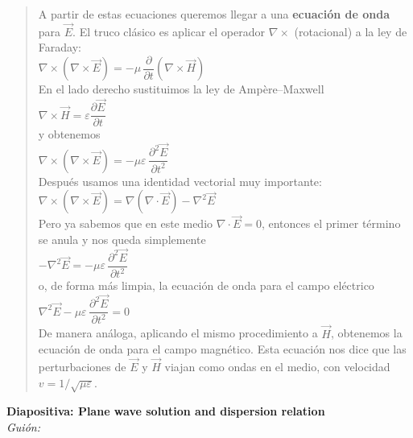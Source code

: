 \documentclass{article}
\begin{document}
\begin{quote}
A partir de estas ecuaciones queremos llegar a una \textbf{ecuación de onda} para \(\vec{E}\). 
El truco clásico es aplicar el operador \(\nabla\times\) (rotacional) a la ley de Faraday:\\[2mm]
\(\nabla\times(\nabla\times\vec{E}) = -\mu\,\dfrac{\partial}{\partial t}(\nabla\times\vec{H})\)\\[2mm]
En el lado derecho sustituimos la ley de Ampère--Maxwell\\[1mm]
\(\nabla\times\vec{H} = \varepsilon\dfrac{\partial \vec{E}}{\partial t}\)\\[2mm]
y obtenemos\\[1mm]
\(\nabla\times(\nabla\times\vec{E}) = -\mu\varepsilon\,\dfrac{\partial^2 \vec{E}}{\partial t^2}\)\\[2mm]
Después usamos una identidad vectorial muy importante:\\[1mm]
\(\nabla\times(\nabla\times\vec{E}) = \nabla(\nabla\cdot\vec{E}) - \nabla^2\vec{E}\)\\[2mm]
Pero ya sabemos que en este medio \(\nabla\cdot\vec{E} = 0\), entonces el primer término se anula 
y nos queda simplemente\\[1mm]
\(-\nabla^2\vec{E} = -\mu\varepsilon\,\dfrac{\partial^2 \vec{E}}{\partial t^2}\)\\[2mm]
o, de forma más limpia, la \textcolor{Tarawera}{ecuación de onda para el campo eléctrico}\\[1mm]
\(\nabla^2\vec{E} - \mu\varepsilon\,\dfrac{\partial^2 \vec{E}}{\partial t^2} = 0\)\\[2mm]
De manera análoga, aplicando el mismo procedimiento a \(\vec{H}\), obtenemos la ecuación de onda 
para el campo magnético. Esta ecuación nos dice que las perturbaciones de \(\vec{E}\) y 
\(\vec{H}\) viajan como ondas en el medio, con velocidad \(v = 1/\sqrt{\mu\varepsilon}\).
\end{quote}

\vspace{0.4cm}

\noindent
\textbf{Diapositiva: Plane wave solution and dispersion relation}\\[2mm]
\textit{Guión:}\\[2mm]
\end{document}
